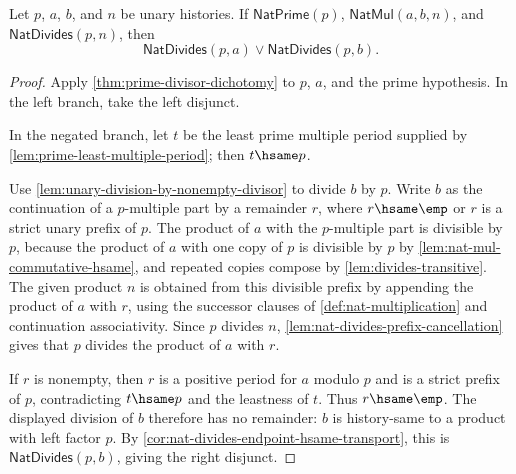 \begin{theorem}
\label{thm:prime-divides-product}
Let $p$, $a$, $b$, and $n$ be unary histories. If $\mathsf{NatPrime}(p)$, $\mathsf{NatMul}(a,b,n)$, and $\mathsf{NatDivides}(p,n)$, then
$$
  \mathsf{NatDivides}(p,a) \vee \mathsf{NatDivides}(p,b).
$$
\end{theorem}
\begin{proof}
Apply \autoref{thm:prime-divisor-dichotomy} to $p$, $a$, and the prime
hypothesis. In the left branch, take the left disjunct.

In the negated branch, let $t$ be the least prime multiple period supplied by
\autoref{lem:prime-least-multiple-period}; then $t\hsame p$.

Use \autoref{lem:unary-division-by-nonempty-divisor} to divide $b$ by $p$. Write $b$ as the continuation of a $p$-multiple part by a remainder $r$, where $r\hsame\emp$ or $r$ is a strict unary prefix of $p$. The product of $a$ with the $p$-multiple part is divisible by $p$, because the product of $a$ with one copy of $p$ is divisible by $p$ by \autoref{lem:nat-mul-commutative-hsame}, and repeated copies compose by \autoref{lem:divides-transitive}. The given product $n$ is obtained from this divisible prefix by appending the product of $a$ with $r$, using the successor clauses of \autoref{def:nat-multiplication} and continuation associativity. Since $p$ divides $n$, \autoref{lem:nat-divides-prefix-cancellation} gives that $p$ divides the product of $a$ with $r$.

If $r$ is nonempty, then $r$ is a positive period for $a$ modulo $p$ and is a strict prefix of $p$, contradicting $t\hsame p$ and the leastness of $t$. Thus $r\hsame\emp$. The displayed division of $b$ therefore has no remainder: $b$ is history-same to a product with left factor $p$. By \autoref{cor:nat-divides-endpoint-hsame-transport}, this is $\mathsf{NatDivides}(p,b)$, giving the right disjunct.
\end{proof}
